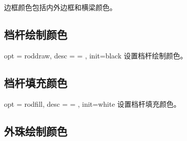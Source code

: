 \documentclass[full]{l3doc}
\begin{document}
\begin{documentation}
\begin{SideBySideExample}[frame=single,numbers=left,%
                xrightmargin=.37\linewidth,gobble=2]
  \centering
  \begin{suanpan}
  \end{suanpan}
\end{SideBySideExample}

  \begin{notezh}
    边框颜色包括内外边框和横梁颜色。
  \end{notezh}

\subsection{档杆绘制颜色}

\begin{option}{ opt = roddraw, desc = {= }, init=black }
  设置档杆绘制颜色。
\end{option}

\begin{SideBySideExample}[frame=single,numbers=left,%
                xrightmargin=.37\linewidth,gobble=2]
  \centering
  \begin{suanpan}
  \end{suanpan}
\end{SideBySideExample}

\subsection{档杆填充颜色}

\begin{option}{ opt = rodfill, desc = {= }, init=white }
  设置档杆填充颜色。
\end{option}

\begin{SideBySideExample}[frame=single,numbers=left,%
                xrightmargin=.37\linewidth,gobble=2]
  \centering
  \begin{suanpan}
  \end{suanpan}
\end{SideBySideExample}

\subsection{外珠绘制颜色}


\end{documentation}
\end{document}
